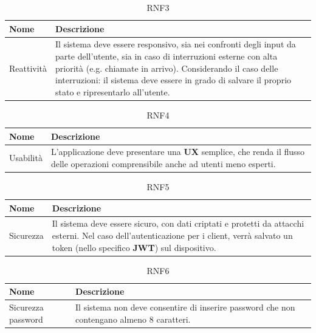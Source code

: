 \documentclass{natourDoc}
\begin{document}
\begin{table}[H]
	\centering
	\begin{tabular}{ |p{5cm}|p{10.3cm}| }
		\hline
		\rowcolor{PineGreen!70}
		\textbf{Nome} & \textbf{Descrizione}                                                                                             \\
		\hline
		Reattività    & Il sistema deve essere responsivo, sia nei confronti degli input da parte dell'utente, sia
		in caso di interruzioni esterne con alta priorità (e.g. chiamate in arrivo).
		Considerando il caso delle interruzioni: il sistema deve essere in grado di salvare il proprio stato e ripresentarlo all'utente. \\
		\hline
	\end{tabular}
	\caption{RNF3}
\end{table}

\begin{table}[H]
	\centering
	\begin{tabular}{ |p{5cm}|p{10.3cm}| }
		\hline
		\rowcolor{PineGreen!70}
		\textbf{Nome} & \textbf{Descrizione}                                                                          \\
		\hline
		Usabilità     & L'applicazione deve presentare una \textbf{UX} semplice, che renda il flusso delle operazioni
		comprensibile anche ad utenti meno esperti.                                                                   \\
		\hline
	\end{tabular}
	\caption{RNF4}
\end{table}

\begin{table}[H]
	\centering
	\begin{tabular}{ |p{5cm}|p{10.3cm}| }
		\hline
		\rowcolor{PineGreen!70}
		\textbf{Nome} & \textbf{Descrizione}                                                                              \\
		\hline
		Sicurezza     & Il sistema deve essere sicuro, con dati criptati e protetti da attacchi esterni.
		Nel caso dell'autenticazione per i client, verrà salvato un token (nello specifico \textbf{JWT}) sul dispositivo. \\
		\hline
	\end{tabular}
	\caption{RNF5}
\end{table}

\begin{table}[H]
	\centering
	\begin{tabular}{ |p{5cm}|p{10.3cm}| }
		\hline
		\rowcolor{PineGreen!70}
		\textbf{Nome}      & \textbf{Descrizione}                                                   \\
		\hline
		Sicurezza password & Il sistema non deve consentire di inserire password che non contengano
		almeno 8 caratteri.                                                                         \\
		\hline
	\end{tabular}
	\caption{RNF6}
\end{table}
\end{document}
